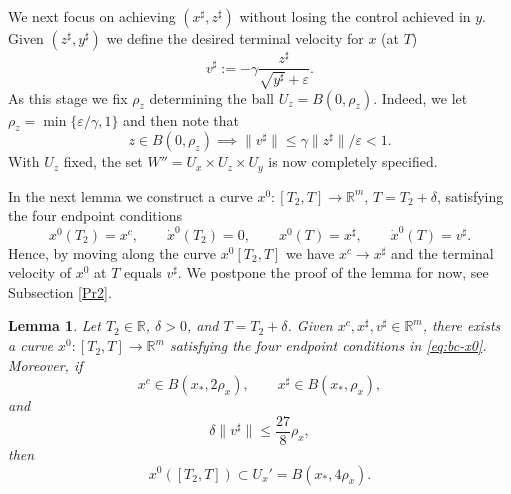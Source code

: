 \documentclass[11pt, a4paper,leqno]{amsart}
\newtheorem{lemma}{Lemma}[section]
\theoremstyle{definition}
\numberwithin{equation}{section}
\begin{document}
We next focus on achieving $(x^\sharp,z^\sharp)$ without losing the control achieved in $y$. Given $(z^\sharp,y^\sharp)$ we define the desired terminal velocity for $x$ (at $T$)
\[
v^\sharp
:=
-\gamma\frac{z^\sharp}{\sqrt{y^\sharp}+\varepsilon}.
\]
As this stage we fix $\rho_z$ determining the ball $U_z=B(0,\rho_z)$. Indeed, we let $\rho_z=\min\{\varepsilon/\gamma,1\}$ and then note that
\begin{equation}\label{tribb}
z\in B(0,\rho_z)\implies \|v^\sharp\|\leq \gamma \|z^\sharp\|/\varepsilon<1.
\end{equation}
With $U_z$ fixed, the set $W''=U_x\times U_z\times U_y$ is now completely specified.

In the next lemma we construct a curve \(x^0:[T_2,T]\to\mathbb R^m\), $T=T_2+\delta$, satisfying the four endpoint conditions
\begin{equation}\label{eq:bc-x0}
x^0(T_2)=x^c,\qquad \dot x^0(T_2)=0,\qquad x^0(T)=x^\sharp,\qquad \dot x^0(T)=v^\sharp.
\end{equation}
Hence, by moving along the curve $x^0[T_2,T]$ we have $x^c\to x^\sharp$ and the terminal velocity of $x^0$ at $T$ equals $v^\sharp$. We postpone the proof of the lemma for now, see Subsection \ref{Pr2}.

\begin{lemma}\label{CdG}
Let \(T_2\in\mathbb R\), \(\delta>0\), and \(T=T_2+\delta\). Given $x^c,x^\sharp,v^\sharp\in\mathbb R^m$,
there exists a curve \(x^0:[T_2,T]\to\mathbb R^m\) satisfying the four endpoint
conditions in \eqref{eq:bc-x0}. Moreover, if
\[
x^c\in B(x_\ast,2\rho_x),\qquad x^\sharp\in B(x_\ast,\rho_x),
\]
and
\begin{equation}\label{tribb+}
\delta\|v^\sharp\|\le \frac{27}{8}\rho_x,
\end{equation}
then
\[
x^0([T_2,T])\subset U_x'=B(x_\ast,4\rho_x).
\]
\end{lemma}
\end{document}
